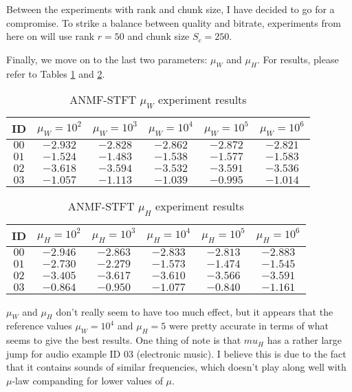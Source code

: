 Between the experiments with rank and chunk size, I have decided to go for a compromise. To strike a balance between quality and bitrate, experiments from here on will use rank $r = 50$ and chunk size $S_c = 250$.

Finally, we move on to the last two parameters: $\mu_W$ and $\mu_H$. For results, please refer to Tables \ref{tab:anmf_stft_muw} and \ref{tab:anmf_stft_muh}.

\begin{table}[htbp]\caption{ANMF-STFT $\mu_W$ experiment results}
	\label{tab:anmf_stft_muw}
	\centering
	\begin{tabular}{|c|c|c|c|c|c|}
		\hline
		ID & $\mu_W = 10^2$ & $\mu_W = 10^3$ & $\mu_W = 10^4$ & $\mu_W = 10^5$ & $\mu_W = 10^6$ \\ \hline
		$00$ & $-2.932$ & $-2.828$ & $-2.862$ & $-2.872$ & $-2.821$ \\
		$01$ & $-1.524$ & $-1.483$ & $-1.538$ & $-1.577$ & $-1.583$ \\
		$02$ & $-3.618$ & $-3.594$ & $-3.532$ & $-3.591$ & $-3.536$ \\
		$03$ & $-1.057$ & $-1.113$ & $-1.039$ & $-0.995$ & $-1.014$	\\
		\hline
	\end{tabular}
\end{table}

\begin{table}[htbp]\caption{ANMF-STFT $\mu_H$ experiment results}
	\label{tab:anmf_stft_muh}
	\centering
	\begin{tabular}{|c|c|c|c|c|c|}
		\hline
		ID & $\mu_H = 10^2$ & $\mu_H = 10^3$ & $\mu_H = 10^4$ & $\mu_H = 10^5$ & $\mu_H = 10^6$ \\ \hline
		$00$ & $-2.946$ & $-2.863$ & $-2.833$ & $-2.813$ & $-2.883$ \\
		$01$ & $-2.730$ & $-2.279$ & $-1.573$ & $-1.474$ & $-1.545$ \\
		$02$ & $-3.405$ & $-3.617$ & $-3.610$ & $-3.566$ & $-3.591$ \\
		$03$ & $-0.864$ & $-0.950$ & $-1.077$ & $-0.840$ & $-1.161$	\\
		\hline
	\end{tabular}
\end{table}

$\mu_W$ and $\mu_H$ don't really seem to have too much effect, but it appears that the reference values $\mu_W = 10^4$ and $\mu_H = 5$ were pretty accurate in terms of what seems to give the best results. One thing of note is that $mu_H$ has a rather large jump for audio example ID 03 (electronic music). I believe this is due to the fact that it contains sounds of similar frequencies, which doesn't play along well with $\mu$-law companding for lower values of $\mu$.

